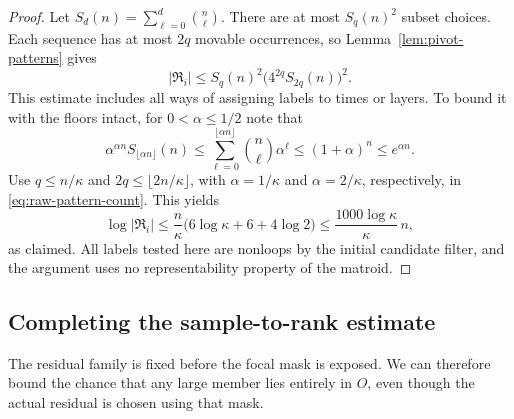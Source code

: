 \begin{proof}
Let $S_d(n)=\sum_{\ell=0}^{d}\binom n\ell$.
There are at most $S_q(n)^2$ subset choices.  Each sequence has at most
$2q$ movable occurrences, so Lemma~\ref{lem:pivot-patterns} gives
\begin{equation}\label{eq:raw-pattern-count}
 |\mathfrak R_i|
 \le S_q(n)^2\bigl(4^{2q}S_{2q}(n)\bigr)^2.
\end{equation}
This estimate includes all ways of assigning labels to times or
layers.
To bound it with the floors intact, for $0<\alpha\le1/2$ note that
\[
 \alpha^{\alpha n}S_{\lfloor\alpha n\rfloor}(n)
 \le\sum_{\ell=0}^{\lfloor\alpha n\rfloor}
          \binom n\ell\alpha^\ell
 \le(1+\alpha)^n\le e^{\alpha n}.
\]
Use $q\le n/\kappa$ and
$2q\le\lfloor2n/\kappa\rfloor$, with
$\alpha=1/\kappa$ and $\alpha=2/\kappa$, respectively, in
\eqref{eq:raw-pattern-count}.  This yields
\[
 \log|\mathfrak R_i|
 \le\frac n\kappa
       \bigl(6\log\kappa+6+4\log2\bigr)
 \le\frac{1000\log\kappa}{\kappa}\,n,
\]
as claimed.  All labels tested here are nonloops by the initial
candidate filter, and the argument uses no representability property
of the matroid.
\end{proof}

\subsection{Completing the sample-to-rank estimate}

The residual family is fixed before the focal mask is exposed.  We can
therefore bound the chance that any large member lies entirely in $O$,
even though the actual residual is chosen using that mask.

